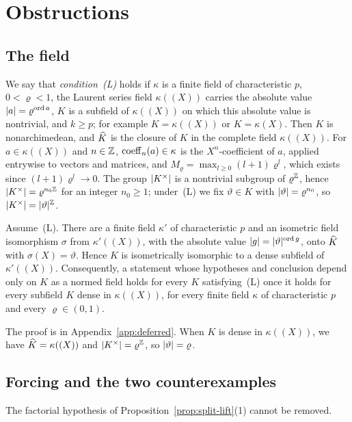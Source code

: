 \section{Obstructions}\label{sec:sharpness}

\subsection{The field}\label{obs:ssec:field}
We say that \emph{condition~\textup{(L)}} holds if $\kappa$ is a finite field of characteristic $p$, $0<\varrho<1$, the
Laurent series field $\kappa((X))$ carries the absolute value $\lvert a\rvert=\varrho^{\operatorname{ord} a}$, $K$ is a subfield of
$\kappa((X))$ on which this absolute value is nontrivial, and $k\ge p$; for example $K=\kappa((X))$ or $K=\kappa(X)$.
Then $K$ is nonarchimedean, and $\widehat K$ is the closure of $K$ in the complete field $\kappa((X))$. For $a\in\kappa((X))$
and $n\in\mathbb Z$, $\operatorname{coeff}_n(a)\in\kappa$ is the $X^n$\nobreakdash-coefficient of $a$, applied entrywise to vectors and
matrices, and $M_\varrho=\max_{l\ge0}(l+1)\varrho^l$, which exists since $(l+1)\varrho^l\to0$. The group
$\lvert K^\times\rvert$ is a nontrivial subgroup of $\varrho^\mathbb Z$, hence $\lvert K^\times\rvert=\varrho^{n_0\mathbb Z}$ for an integer
$n_0\ge1$; under~\textup{(L)} we fix $\vartheta\in K$ with $\lvert \vartheta\rvert=\varrho^{n_0}$, so $\lvert K^\times\rvert=\lvert \vartheta\rvert^\mathbb Z$.

\begin{lemma}\label{obs:lem:normalization}
Assume~\textup{(L)}. There are a finite field $\kappa'$ of characteristic $p$ and an isometric field isomorphism
$\sigma$ from $\kappa'((X))$, with the absolute value $\lvert g\rvert=\lvert \vartheta\rvert^{\operatorname{ord} g}$, onto $\widehat K$ with $\sigma(X)=\vartheta$.
Hence $K$ is isometrically isomorphic to a dense subfield of $\kappa'((X))$. Consequently, a statement whose hypotheses
and conclusion depend only on $K$ as a normed field holds for every $K$ satisfying~\textup{(L)} once it holds for every
subfield $K$ dense in $\kappa((X))$, for every finite field $\kappa$ of characteristic $p$ and every $\varrho\in(0,1)$.
\end{lemma}

The proof is in Appendix~\ref{app:deferred}. When $K$ is dense in $\kappa((X))$, we have $\widehat K=\kappa((X))$ and
$\lvert K^\times\rvert=\varrho^\mathbb Z$, so $\lvert \vartheta\rvert=\varrho$.

\subsection{Forcing and the two counterexamples}\label{obs:ssec:counterexamples}
The factorial hypothesis of Proposition~\ref{prop:split-lift}(1) cannot be removed.

